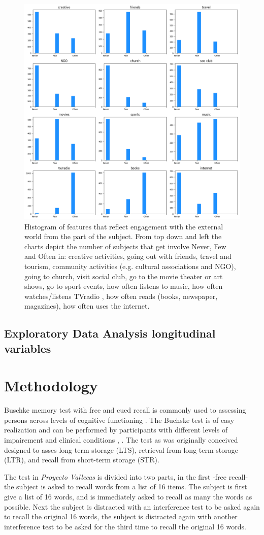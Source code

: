 \documentclass[11pt]{article}
\theoremstyle{definition}
\theoremstyle{remark}
\begin{document}
\begin{figure}[H]
        \centering
        \includegraphics[keepaspectratio, width=0.5\linewidth]{figures/Fig_engage}
        \caption{Histogram of features that reflect engagement with the external world from the part of the subject. From top down and left the charts depict the number of subjects that get involve Never, Few and Often in: creative activities, going out with friends, travel and tourism, community activities (e.g. cultural associations and NGO), going to church, visit social club, go to the movie theater or art shows, go to sport events, how often listens to music, how often watches/listens TVradio , how often reads (books, newspaper, magazines), how often uses the internet.} 
        \label{fig:engage}
\end{figure}

\subsection{Exploratory Data Analysis longitudinal variables}

\section{Methodology}
\label{se:met}
Buschke memory test with free and cued recall is commonly used to assessing persons across levels of cognitive functioning \cite{buschke1973selective}. The Buchske test is of easy realization and can be performed by participants with different levels of impairement and clinical conditions \cite{o200212}, \cite{leitner2017comparison}. The test as was originally conceived designed to asses long-term storage (LTS), retrieval from long-term storage (LTR), and recall from short-term storage (STR).

The test in \emph{Proyecto Vallecas} is divided into two parts, in the first -free recall- the subject is asked to recall words from a list of 16 items. The subject is first give a list of 16 words, and is immediately asked to recall as many the words as possible. Next the subject is distracted with an interference test to be asked again to recall the original 16 words, the subject is distracted again with another interference test to be asked for the third time to recall the original 16 words.
\end{document}
